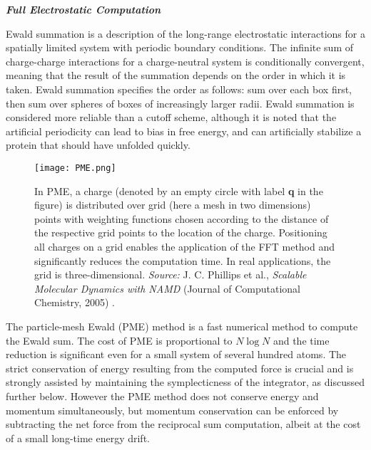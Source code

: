 \begin{center}
{\textbf{\textit{Full Electrostatic Computation}}}
\end{center}
Ewald summation is a description of the long-range electrostatic interactions for a spatially limited system with periodic boundary conditions. The infinite sum of charge-charge interactions for a charge-neutral system is conditionally convergent, meaning that the result of the summation depends on the order in which it is taken. Ewald summation specifies the order as follows: sum over each box first, then sum over spheres of boxes of increasingly larger radii. Ewald summation is considered more reliable than a cutoff scheme, although it is noted that the artificial periodicity can lead to bias in free energy, and can artificially stabilize a protein that should have unfolded quickly.
\begin{figure}[H]
\centering
\begin{minipage}[t]{0.8\textwidth}
	\centering
    \texttt{[image: PME.png]}
    
    \footnotesize{\caption{In PME, a charge (denoted by an empty circle with label \textbf{q} in the figure) is distributed over grid (here a mesh in two dimensions) points with weighting functions chosen according to the distance of the respective grid points to the location of the charge. Positioning all charges on a grid enables the application of the FFT method and significantly reduces the computation time. In real applications, the grid is three-dimensional.
    \textit{Source:} J. C. Phillips et al., \textit{Scalable Molecular Dynamics with NAMD} (Journal of Computational Chemistry, 2005) 
    \cite{ref:NAMD}.}
    \label{fig:PME}
    }
\end{minipage} 
\end{figure}

The particle-mesh Ewald (PME) method is a fast numerical method to compute the Ewald sum. The cost of PME is proportional to $N \log N$ and the time reduction is significant even for a small system of several hundred atoms. 
The strict conservation of energy resulting from the computed force is crucial and is strongly assisted by maintaining the symplecticness of the integrator, as discussed further below.
However the PME method does not conserve energy and momentum simultaneously, but momentum conservation can be enforced by subtracting the net force from the reciprocal sum computation, albeit at the cost of a small long-time energy drift.

